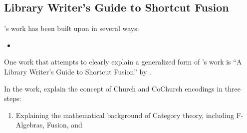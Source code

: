 
\subsection{Library Writer's Guide to Shortcut Fusion}
\cite{Gill1993}'s work has been built upon in several ways:

\begin{itemize}
    \item 
\end{itemize}



One work that attempts to clearly explain a generalized form of \cite{Gill1993}'s work is ``A Library Writer's Guide to Shortcut Fusion'' by \cite{Harper2011}.


In the work, \cite{Harper2011} explain the concept of Church and CoChurch encodings in three steps:
\begin{enumerate}
    \item Explaining the mathematical background of Category theory, including F-Algebras, Fusion, and 
\end{enumerate}


